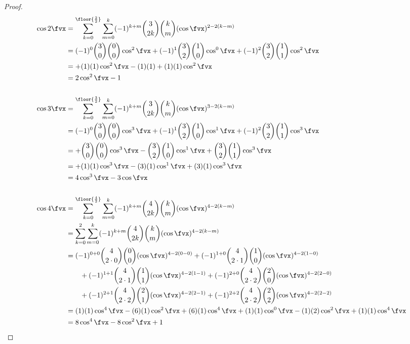 \begin{proof}
\begin{align*}
  \cos2\fvx
    &= \sum_{k=0}^\floor{\frac{2}{2}}\sum_{m=0}^k      
         (-1)^{k+m} {3\choose 2k  }{k\choose m}(\cos\fvx)^{2-2(k-m)}
  \\&= (-1)^0 {3\choose0}{0\choose0}\cos^2\fvx +
       (-1)^1 {3\choose2}{1\choose0}\cos^0\fvx +
       (-1)^2 {3\choose2}{1\choose1}\cos^2\fvx
  \\&= + (1)(1)\cos^2\fvx 
       - (1)(1) 
       + (1)(1)\cos^2\fvx
  \\&= 2\cos^2\fvx -1
\\
\\
  \cos3\fvx
    &= \sum_{k=0}^\floor{\frac{3}{2}}\sum_{m=0}^k      
         (-1)^{k+m} {3\choose 2k  }{k\choose m}(\cos\fvx)^{3-2(k-m)}
  \\&= (-1)^0 {3\choose 0}{0\choose0}\cos^3\fvx +
       (-1)^1 {3\choose 2}{1\choose0}\cos^1\fvx +
       (-1)^2 {3\choose 2}{1\choose1}\cos^3\fvx
  \\&= + {3\choose 0}{0\choose0}\cos^3\fvx 
       - {3\choose 2}{1\choose0}\cos^1\fvx 
       + {3\choose 2}{1\choose1}\cos^3\fvx
  \\&= + (1)(1)\cos^3\fvx 
       - (3)(1)\cos^1\fvx 
       + (3)(1)\cos^3\fvx
  \\&= 4\cos^3\fvx - 3\cos\fvx 
\\
\\
  \cos4\fvx
    &= \sum_{k=0}^\floor{\frac{4}{2}}\sum_{m=0}^k      
         (-1)^{k+m} {4\choose 2k  }{k\choose m}(\cos\fvx)^{4-2(k-m)}
  \\&= \sum_{k=0}^2 \sum_{m=0}^k      
         (-1)^{k+m} {4\choose 2k  }{k\choose m}(\cos\fvx)^{4-2(k-m)}
  \\&=  (-1)^{0+0}{4\choose2\cdot0}{0\choose0}(\cos\fvx)^{4-2(0-0)}
       +(-1)^{1+0}{4\choose2\cdot1}{1\choose0}(\cos\fvx)^{4-2(1-0)}
  \\&\qquad
       +(-1)^{1+1}{4\choose2\cdot1}{1\choose1}(\cos\fvx)^{4-2(1-1)}
       +(-1)^{2+0}{4\choose2\cdot2}{2\choose0}(\cos\fvx)^{4-2(2-0)}
  \\&\qquad
       +(-1)^{2+1}{4\choose2\cdot2}{2\choose1}(\cos\fvx)^{4-2(2-1)}
       +(-1)^{2+2}{4\choose2\cdot2}{2\choose2}(\cos\fvx)^{4-2(2-2)}
  \\&=  (1)(1) \cos^4\fvx
       -(6)(1) \cos^2\fvx
       +(6)(1) \cos^4\fvx
       +(1)(1) \cos^0\fvx
       -(1)(2) \cos^2\fvx
       +(1)(1) \cos^4\fvx
  \\&=  8\cos^4\fvx -8\cos^2\fvx + 1
\\

\end{align*}
\end{proof}
